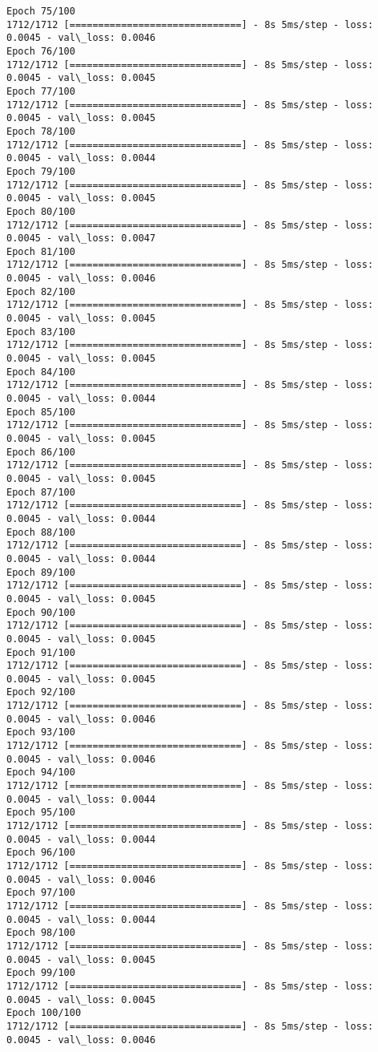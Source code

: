 \documentclass[11pt]{article}
\begin{document}
\begin{Verbatim}[commandchars=\\\{\}]
Epoch 75/100
1712/1712 [==============================] - 8s 5ms/step - loss: 0.0045 - val\_loss: 0.0046
Epoch 76/100
1712/1712 [==============================] - 8s 5ms/step - loss: 0.0045 - val\_loss: 0.0045
Epoch 77/100
1712/1712 [==============================] - 8s 5ms/step - loss: 0.0045 - val\_loss: 0.0045
Epoch 78/100
1712/1712 [==============================] - 8s 5ms/step - loss: 0.0045 - val\_loss: 0.0044
Epoch 79/100
1712/1712 [==============================] - 8s 5ms/step - loss: 0.0045 - val\_loss: 0.0045
Epoch 80/100
1712/1712 [==============================] - 8s 5ms/step - loss: 0.0045 - val\_loss: 0.0047
Epoch 81/100
1712/1712 [==============================] - 8s 5ms/step - loss: 0.0045 - val\_loss: 0.0046
Epoch 82/100
1712/1712 [==============================] - 8s 5ms/step - loss: 0.0045 - val\_loss: 0.0045
Epoch 83/100
1712/1712 [==============================] - 8s 5ms/step - loss: 0.0045 - val\_loss: 0.0045
Epoch 84/100
1712/1712 [==============================] - 8s 5ms/step - loss: 0.0045 - val\_loss: 0.0044
Epoch 85/100
1712/1712 [==============================] - 8s 5ms/step - loss: 0.0045 - val\_loss: 0.0045
Epoch 86/100
1712/1712 [==============================] - 8s 5ms/step - loss: 0.0045 - val\_loss: 0.0045
Epoch 87/100
1712/1712 [==============================] - 8s 5ms/step - loss: 0.0045 - val\_loss: 0.0044
Epoch 88/100
1712/1712 [==============================] - 8s 5ms/step - loss: 0.0045 - val\_loss: 0.0044
Epoch 89/100
1712/1712 [==============================] - 8s 5ms/step - loss: 0.0045 - val\_loss: 0.0045
Epoch 90/100
1712/1712 [==============================] - 8s 5ms/step - loss: 0.0045 - val\_loss: 0.0045
Epoch 91/100
1712/1712 [==============================] - 8s 5ms/step - loss: 0.0045 - val\_loss: 0.0045
Epoch 92/100
1712/1712 [==============================] - 8s 5ms/step - loss: 0.0045 - val\_loss: 0.0046
Epoch 93/100
1712/1712 [==============================] - 8s 5ms/step - loss: 0.0045 - val\_loss: 0.0046
Epoch 94/100
1712/1712 [==============================] - 8s 5ms/step - loss: 0.0045 - val\_loss: 0.0044
Epoch 95/100
1712/1712 [==============================] - 8s 5ms/step - loss: 0.0045 - val\_loss: 0.0044
Epoch 96/100
1712/1712 [==============================] - 8s 5ms/step - loss: 0.0045 - val\_loss: 0.0046
Epoch 97/100
1712/1712 [==============================] - 8s 5ms/step - loss: 0.0045 - val\_loss: 0.0044
Epoch 98/100
1712/1712 [==============================] - 8s 5ms/step - loss: 0.0045 - val\_loss: 0.0045
Epoch 99/100
1712/1712 [==============================] - 8s 5ms/step - loss: 0.0045 - val\_loss: 0.0045
Epoch 100/100
1712/1712 [==============================] - 8s 5ms/step - loss: 0.0045 - val\_loss: 0.0046

    \end{Verbatim}
\end{document}
